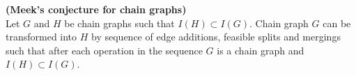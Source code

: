 %
%
%





\begin{thm} \textbf{(Meek's conjecture for chain graphs)} \\
	Let $G$ and $H$ be chain graphs such that $I(H) \subset I(G)$. 
	Chain graph $G$ can be transformed into $H$ by sequence of edge additions, feasible splits and mergings such that
	after each operation in the sequence $G$ is a chain graph and $I(H) \subset I(G)$.
\end{thm}
